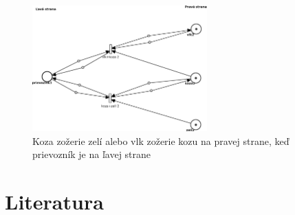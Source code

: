 \documentclass[11pt,a4paper]{article}
\begin{document}
\begin{figure}[H]
    \centering
	\includegraphics[width=0.6\textwidth]{pn4NEW.eps}
    \caption{Koza zožerie zelí alebo vlk zožerie kozu na pravej strane, keď prievozník je na ľavej strane}
    \label{fig:pn4}
\end{figure}

\newpage

\section{Literatura}

\begin{flushleft}
    
    \end{flushleft}
\end{document}
